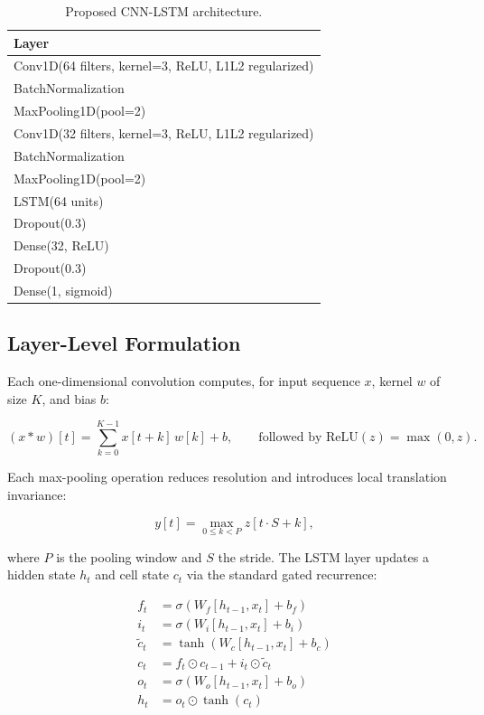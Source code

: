 \documentclass[11pt]{article}
\begin{document}
\begin{table}[h]
\centering
\caption{Proposed CNN-LSTM architecture.}
\label{tab:arch}
\begin{tabular}{l}
\toprule
\textbf{Layer} \\
\midrule
Conv1D(64 filters, kernel=3, ReLU, L1L2 regularized) \\
BatchNormalization \\
MaxPooling1D(pool=2) \\
Conv1D(32 filters, kernel=3, ReLU, L1L2 regularized) \\
BatchNormalization \\
MaxPooling1D(pool=2) \\
LSTM(64 units) \\
Dropout(0.3) \\
Dense(32, ReLU) \\
Dropout(0.3) \\
Dense(1, sigmoid) \\
\bottomrule
\end{tabular}
\end{table}

\subsection{Layer-Level Formulation}

Each one-dimensional convolution computes, for input sequence $x$, kernel $w$ of size $K$, and bias
$b$:

\begin{equation}
(x * w)[t] = \sum_{k=0}^{K-1} x[t+k]\, w[k] + b, \qquad \text{followed by } \text{ReLU}(z) = \max(0, z).
\end{equation}

Each max-pooling operation reduces resolution and introduces local translation invariance:

\begin{equation}
y[t] = \max_{0 \le k < P} z[t \cdot S + k],
\end{equation}

where $P$ is the pooling window and $S$ the stride. The LSTM layer updates a hidden state
$h_t$ and cell state $c_t$ via the standard gated recurrence:

\begin{align}
f_t &= \sigma(W_f [h_{t-1}, x_t] + b_f) \\
i_t &= \sigma(W_i [h_{t-1}, x_t] + b_i) \\
\tilde{c}_t &= \tanh(W_c [h_{t-1}, x_t] + b_c) \\
c_t &= f_t \odot c_{t-1} + i_t \odot \tilde{c}_t \\
o_t &= \sigma(W_o [h_{t-1}, x_t] + b_o) \\
h_t &= o_t \odot \tanh(c_t)
\end{align}
\end{document}
